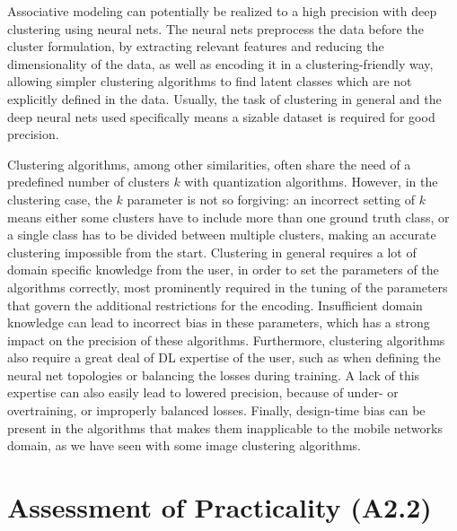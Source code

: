 		Associative modeling can potentially be realized to a high precision with deep clustering using neural nets.
		The neural nets preprocess the data before the cluster formulation, by extracting relevant features and reducing the dimensionality of the data, as well as encoding it in a clustering-friendly way, allowing simpler clustering algorithms to find latent classes which are not explicitly defined in the data.
		Usually, the task of clustering in general and the deep neural nets used specifically means a sizable dataset is required for good precision.
				
		Clustering algorithms, among other similarities, often share the need of a predefined number of clusters $k$ with quantization algorithms.
		However, in the clustering case, the $k$ parameter is not so forgiving: an incorrect setting of $k$ means either some clusters have to include more than one ground truth class, or a single class has to be divided between multiple clusters, making an accurate clustering impossible from the start.
		Clustering in general requires a lot of domain specific knowledge from the user, in order to set the parameters of the algorithms correctly, most prominently required in the tuning of the parameters that govern the additional restrictions for the encoding.
		Insufficient domain knowledge can lead to incorrect bias in these parameters, which has a strong impact on the precision of these algorithms.
		Furthermore, clustering algorithms also require a great deal of \ac{DL} expertise of the user, such as when defining the neural net topologies or balancing the losses during training.
		A lack of this expertise can also easily lead to lowered precision, because of under- or overtraining, or improperly balanced losses.
		Finally, design-time bias can be present in the algorithms that makes them inapplicable to the mobile networks domain, as we have seen with some image clustering algorithms.

	\section{Assessment of Practicality (A2.2)}
	
